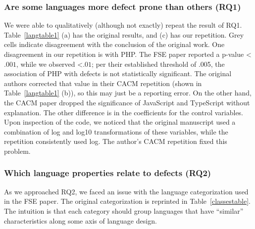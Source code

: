 \documentclass[acmsmall]{acmart}
\newcommand{\ts}{{\sf  TypeScript}\xspace}
\newcommand{\js}{{\sf  JavaScript}\xspace}
\newcommand{\php}{{\sf  PHP}\xspace}
\begin{document}
\subsubsection{Are some languages more defect prone than others (RQ1)}

We were able to qualitatively (although not exactly) repeat the result of
RQ1. Table~\ref{langtable1} (a) has the original results, and (c) has our
repetition.  Grey cells indicate disagreement with the conclusion of the
original work.  One disagreement in our repetition is with \php. The FSE paper
reported a p-value <$.001$, while we observed <$.01$; per their established
threshold of .005, the
association of \php with defects is not statistically significant. The
original authors corrected that value in their CACM repetition (shown in
Table~\ref{langtable1} (b)), so this may just be a reporting error. On the
other hand, the CACM paper dropped the significance of \js and \ts without
explanation. The other difference is in the coefficients for the control
variables. Upon inspection of the code, we noticed that the original
manuscript used a combination of log and log10 transformations of these
variables, while the repetition consistently used log. The author's CACM
repetition fixed this problem.

\subsubsection{Which language properties relate to defects (RQ2)}

As we approached RQ2, we faced an issue with the language categorization
used in the FSE paper. The original categorization is reprinted in
Table~\ref{classestable}.  The intuition is that each category should group
languages that have ``similar'' characteristics along some axis of language
design.
\end{document}
